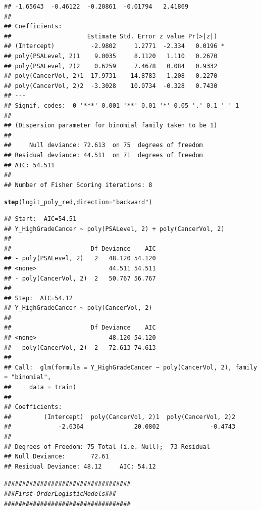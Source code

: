 \documentclass{article}\usepackage[]{graphicx}\usepackage[]{color}
\makeatletter
\newcommand{\hlstr}[1]{\textcolor[rgb]{0.192,0.494,0.8}{#1}}%
\newcommand{\hlcom}[1]{\textcolor[rgb]{0.678,0.584,0.686}{\textit{#1}}}%
\newcommand{\hlstd}[1]{\textcolor[rgb]{0.345,0.345,0.345}{#1}}%
\newcommand{\hlkwc}[1]{\textcolor[rgb]{0.333,0.667,0.333}{#1}}%
\newcommand{\hlkwd}[1]{\textcolor[rgb]{0.737,0.353,0.396}{\textbf{#1}}}%
\newenvironment{kframe}{%
 \def\at@end@of@kframe{}%
 \ifinner\ifhmode%
  \def\at@end@of@kframe{\end{minipage}}%
  \begin{minipage}{\columnwidth}%
 \fi\fi%
 \def\FrameCommand##1{\hskip\@totalleftmargin \hskip-\fboxsep
 \colorbox{shadecolor}{##1}\hskip-\fboxsep
     \hskip-\linewidth \hskip-\@totalleftmargin \hskip\columnwidth}%
 \MakeFramed {\advance\hsize-\width
   \@totalleftmargin\z@ \linewidth\hsize
   \@setminipage}}%
 {\par\unskip\endMakeFramed%
 \at@end@of@kframe}
\newenvironment{knitrout}{}{} %
\makeatother
\begin{document}
\begin{knitrout}
\begin{kframe}
\begin{verbatim}
## -1.65643  -0.46122  -0.20861  -0.01794   2.41869  
## 
## Coefficients:
##                     Estimate Std. Error z value Pr(>|z|)  
## (Intercept)          -2.9802     1.2771  -2.334   0.0196 *
## poly(PSALevel, 2)1    9.0035     8.1120   1.110   0.2670  
## poly(PSALevel, 2)2    0.6259     7.4678   0.084   0.9332  
## poly(CancerVol, 2)1  17.9731    14.8783   1.208   0.2270  
## poly(CancerVol, 2)2  -3.3028    10.0734  -0.328   0.7430  
## ---
## Signif. codes:  0 '***' 0.001 '**' 0.01 '*' 0.05 '.' 0.1 ' ' 1
## 
## (Dispersion parameter for binomial family taken to be 1)
## 
##     Null deviance: 72.613  on 75  degrees of freedom
## Residual deviance: 44.511  on 71  degrees of freedom
## AIC: 54.511
## 
## Number of Fisher Scoring iterations: 8
\end{verbatim}
\begin{alltt}
\hlkwd{step}\hlstd{(logit_poly_red,} \hlkwc{direction}\hlstd{=}\hlstr{"backward"}\hlstd{)}
\end{alltt}
\begin{verbatim}
## Start:  AIC=54.51
## Y_HighGradeCancer ~ poly(PSALevel, 2) + poly(CancerVol, 2)
## 
##                      Df Deviance    AIC
## - poly(PSALevel, 2)   2   48.120 54.120
## <none>                    44.511 54.511
## - poly(CancerVol, 2)  2   50.767 56.767
## 
## Step:  AIC=54.12
## Y_HighGradeCancer ~ poly(CancerVol, 2)
## 
##                      Df Deviance    AIC
## <none>                    48.120 54.120
## - poly(CancerVol, 2)  2   72.613 74.613
## 
## Call:  glm(formula = Y_HighGradeCancer ~ poly(CancerVol, 2), family = "binomial", 
##     data = train)
## 
## Coefficients:
##         (Intercept)  poly(CancerVol, 2)1  poly(CancerVol, 2)2  
##             -2.6364              20.0802              -0.4743  
## 
## Degrees of Freedom: 75 Total (i.e. Null);  73 Residual
## Null Deviance:	    72.61 
## Residual Deviance: 48.12 	AIC: 54.12
\end{verbatim}
\begin{alltt}
\hlcom{###################################}
\hlcom{### First-Order Logistic Models ###}
\hlcom{###################################}


\end{alltt}
\end{kframe}
\end{knitrout}
\end{document}
